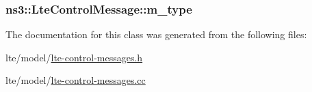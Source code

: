 \subsubsection[{\texorpdfstring{m\+\_\+type}{m_type}}]{ ns3\+::\+Lte\+Control\+Message\+::m\+\_\+type\hspace{0.3cm}{\ttfamily [private]}}\hypertarget{classns3_1_1LteControlMessage_a93d63619d05b76cd19f1daf54428eaa6}{}\label{classns3_1_1LteControlMessage_a93d63619d05b76cd19f1daf54428eaa6}


The documentation for this class was generated from the following files\+:\begin{DoxyCompactItemize}
\item 
lte/model/\hyperlink{lte-control-messages_8h}{lte-\/control-\/messages.\+h}\item 
lte/model/\hyperlink{lte-control-messages_8cc}{lte-\/control-\/messages.\+cc}\end{DoxyCompactItemize}
